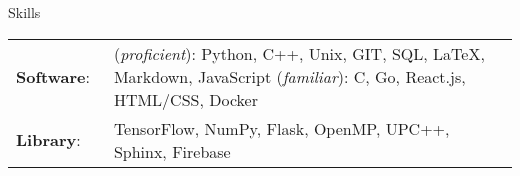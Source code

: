 \documentclass{resume} %
\begin{document}
\begin{rSection}{Skills}
\begin{tabular}{@{}l@{}l@{}}
    {\bf Software}:~ & (\textit{proficient}): Python, C++, Unix, GIT, SQL, LaTeX, Markdown, JavaScript (\textit{familiar}): C, Go, React.js, HTML/CSS, Docker \\
    {\bf Library}:~ & TensorFlow, NumPy, Flask, OpenMP, UPC++, Sphinx, Firebase
\end{tabular}
\end{rSection}
\end{document}
